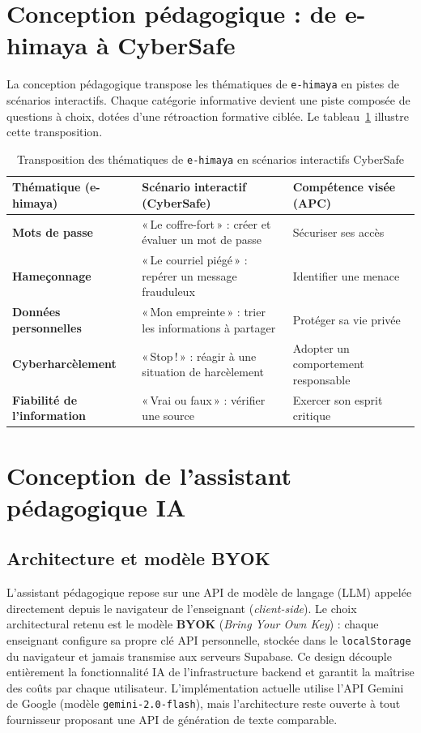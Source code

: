 \documentclass[12pt, a4paper, oneside]{report}
\begin{document}
\section{Conception pédagogique : de e-himaya à CyberSafe}
La conception pédagogique transpose les thématiques de \texttt{e-himaya} en pistes de scénarios interactifs. Chaque catégorie informative devient une piste composée de questions à choix, dotées d'une rétroaction formative ciblée. Le tableau~\ref{tab:mapping} illustre cette transposition.

\begin{table}[H]
\centering
\caption{Transposition des thématiques de \texttt{e-himaya} en scénarios interactifs CyberSafe}
\label{tab:mapping}
\begin{tabularx}{\textwidth}{@{}>{\bfseries}l X X@{}}
\toprule
Thématique (e-himaya) & Scénario interactif (CyberSafe) & Compétence visée (APC) \\
\midrule
Mots de passe & «\,Le coffre-fort\,» : créer et évaluer un mot de passe & Sécuriser ses accès \\
Hameçonnage & «\,Le courriel piégé\,» : repérer un message frauduleux & Identifier une menace \\
Données personnelles & «\,Mon empreinte\,» : trier les informations à partager & Protéger sa vie privée \\
Cyberharcèlement & «\,Stop\,!\,» : réagir à une situation de harcèlement & Adopter un comportement responsable \\
Fiabilité de l'information & «\,Vrai ou faux\,» : vérifier une source & Exercer son esprit critique \\
\bottomrule
\end{tabularx}
\end{table}

\section{Conception de l'assistant pédagogique IA}

\subsection{Architecture et modèle BYOK}
L'assistant pédagogique repose sur une API de modèle de langage (LLM) appelée directement depuis le navigateur de l'enseignant (\textit{client-side}). Le choix architectural retenu est le modèle \textbf{BYOK} (\textit{Bring Your Own Key}) : chaque enseignant configure sa propre clé API personnelle, stockée dans le \texttt{localStorage} du navigateur et jamais transmise aux serveurs Supabase. Ce design découple entièrement la fonctionnalité IA de l'infrastructure backend et garantit la maîtrise des coûts par chaque utilisateur. L'implémentation actuelle utilise l'API Gemini de Google (modèle \texttt{gemini-2.0-flash}), mais l'architecture reste ouverte à tout fournisseur proposant une API de génération de texte comparable.
\end{document}
